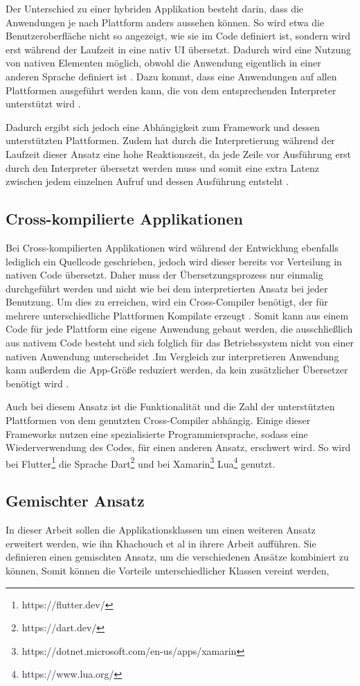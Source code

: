 Der Unterschied zu einer hybriden Applikation besteht darin, dass die Anwendungen je nach Plattform anders aussehen können. So wird etwa die Benutzeroberfläche nicht so angezeigt, wie sie im Code definiert ist, sondern wird erst während der Laufzeit in eine nativ \ac{UI} übersetzt.
Dadurch wird eine Nutzung von nativen Elementen möglich, obwohl die Anwendung eigentlich in einer anderen Sprache definiert ist \cite{IEEE_development_classes}. 
Dazu kommt, dass eine Anwendungen auf allen Plattformen ausgeführt werden kann, die von dem entsprechenden Interpreter unterstützt wird \cite{server_side}.

Dadurch ergibt sich jedoch eine Abhängigkeit zum Framework und dessen unterstützten Plattformen. Zudem hat durch die Interpretierung während der Laufzeit dieser Ansatz eine hohe Reaktionszeit, da jede Zeile vor Ausführung erst durch den Interpreter übersetzt werden muss und somit eine extra Latenz zwischen jedem einzelnen Aufruf und dessen Ausführung entsteht \cite{server_side}.

\subsection{Cross-kompilierte Applikationen}
Bei Cross-kompilierten Applikationen wird während der Entwicklung ebenfalls lediglich ein Quellcode geschrieben, jedoch wird dieser bereits vor Verteilung in nativen Code übersetzt. Daher muss der Übersetzungsprozess nur einmalig durchgeführt werden und nicht wie bei dem interpretierten Ansatz bei jeder Benutzung. Um dies zu erreichen, wird ein Cross-Compiler benötigt, der für mehrere unterschiedliche Plattformen Kompilate erzeugt \cite{mobiledraft_cross_plattform}. Somit kann aus einem Code für jede Plattform eine eigene Anwendung gebaut werden, die ausschließlich aus nativem Code besteht und sich folglich für das Betriebssystem nicht von einer nativen Anwendung unterscheidet \cite{IEEE_development_classes}.Im Vergleich zur interpretieren Anwendung kann außerdem die App-Größe reduziert werden, da kein zusätzlicher Übersetzer benötigt wird \cite{mobiledraft_cross_plattform}.

Auch bei diesem Ansatz ist die Funktionalität und die Zahl der unterstützten Plattformen von dem genutzten Cross-Compiler abhängig. Einige dieser Frameworks nutzen eine spezialisierte Programmiersprache, sodass eine Wiederverwendung des Codes, für einen anderen Ansatz, erschwert wird. So wird bei Flutter\footnote{https://flutter.dev/} die Sprache Dart\footnote{https://dart.dev/} und bei Xamarin\footnote{https://dotnet.microsoft.com/en-us/apps/xamarin} Lua\footnote{https://www.lua.org/} genutzt.


\subsection{Gemischter Ansatz}
In dieser Arbeit sollen die Applikationsklassen um einen weiteren Ansatz erweitert werden, wie ihn Khachouch et al \cite{IEEE_Khackouch_Al} in ihrere Arbeit aufführen. Sie definieren einen gemischten Ansatz, um die verschiedenen Ansätze kombiniert zu können, Somit können die Vorteile unterschiedlicher Klassen vereint werden,
